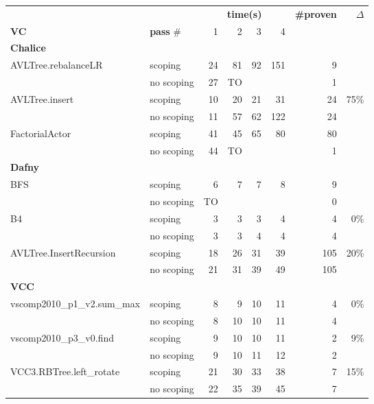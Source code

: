 \begin{table}
\centering
\scriptsize
\begin{tabular}{|l|l||r|r|r|r||r|r|}
\hline
            &     & \multicolumn{4}{c||}{\textbf{time(s)}}    &   \textbf{\#proven}    & \textbf{$\Delta$} \\
 \textbf{VC}&   \textbf{pass} \#                     & 1  & 2   &   3 &   4 &  & \\
\hline
\textbf{Chalice}  &&&&& && \\
\hline
AVLTree.rebalanceLR &  scoping    & 24	 & 81	 &  92 &  151  & 9 &  \\
                 &  no scoping & 27	 & TO	 &     &       & 1 & \\
\hline
AVLTree.insert   &  scoping    & 10  &	20 &	21 &	31   & 24 &  75\% \\
                  &  no scoping & 11	 & 57	 &  62 &  122  & 24 &\\
\hline
FactorialActor   &  scoping  & 41 &  45    &   65    &   80&  80 &  \\
                  &  no scoping &  44 & TO &         &     &  1  &\\
\hline
\textbf{Dafny} &&&&&&&\\
\hline
BFS              &  scoping    & 6  &	7 &	7 &	8    & 9  & \\
                  &  no scoping & TO	 & 	 &   &    & 0 & \\
\hline					
B4               &  scoping    & 3  &	3 &	3 &	4  & 4  & 0\%\\
                  &  no scoping & 3	& 3 & 4 & 4  & 4 &  \\
\hline					
AVLTree.InsertRecursion   &  scoping    & 18 &	26 &	31 & 39 & 105 & 20\%\\
                          &  no scoping & 21 & 31	 &  39 &  49 & 105 & \\
\hline
\textbf{VCC}      & & & & & & &\\
\hline					
vscomp2010\_p1\_v2.sum\_max  &  scoping    & 8 &	9 &	10 & 11 & 4 & 0\%\\
                          &  no scoping & 8 & 10 & 10 & 11 & 4  & \\
\hline
vscomp2010\_p3\_v0.find     &  scoping    & 9 &	10 & 10 & 11 & 2 & 9\%\\
                          &  no scoping & 9 & 10 & 11 & 12 & 2  & \\
\hline
VCC3.RBTree.left\_rotate   &  scoping    & 21 &	30 & 33 & 38 & 7 & 15\%\\
                          &  no scoping & 22 & 35 & 39 & 45 & 7  &\\

\end{tabular}
\end{table}
